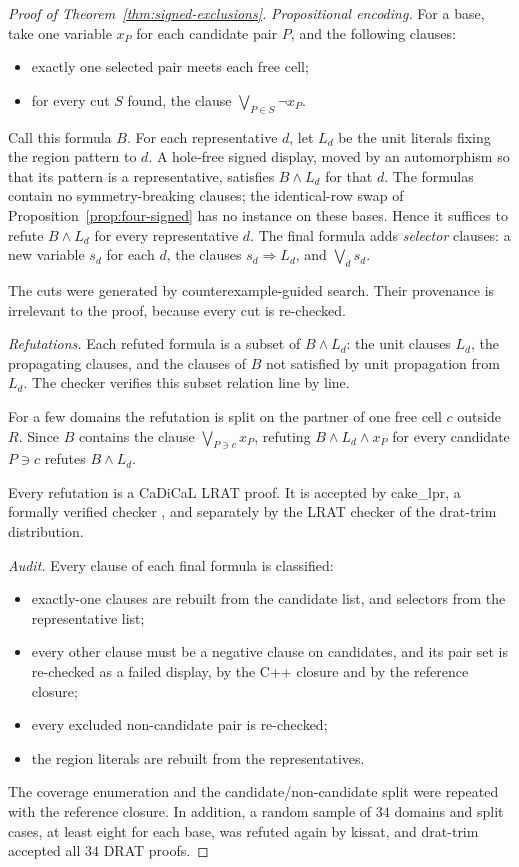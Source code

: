 \documentclass[11pt,a4paper]{article}
\theoremstyle{definition}
\begin{document}
\begin{proof}[Proof of Theorem~\ref{thm:signed-exclusions}]
\emph{Propositional encoding.} For a base, take one variable $x_P$ for
each candidate pair $P$, and the following clauses:
\begin{itemize}
\item exactly one selected pair meets each free cell;
\item for every cut $S$ found, the clause $\bigvee_{P\in S}\neg x_P$.
\end{itemize}
Call this formula $B$. For each representative $d$, let $L_d$ be the unit
literals fixing the region pattern to $d$. A hole-free signed display,
moved by an automorphism so that its pattern is a representative,
satisfies $B\wedge L_d$ for that $d$. The formulas contain no
symmetry-breaking clauses; the identical-row swap of
Proposition~\ref{prop:four-signed} has no instance on these bases.
Hence it suffices to refute $B\wedge L_d$ for every representative $d$.
The final formula adds \emph{selector} clauses: a new variable $s_d$
for each $d$, the clauses $s_d\Rightarrow L_d$, and $\bigvee_d s_d$.

The cuts were generated by counterexample-guided search. Their
provenance is irrelevant to the proof, because every cut is re-checked.

\emph{Refutations.} Each refuted formula is a subset of $B\wedge L_d$: the unit clauses
$L_d$, the propagating clauses, and the clauses of $B$ not satisfied
by unit propagation from $L_d$. The checker verifies this subset relation line by
line.

For a few domains the refutation is split on the partner of one free cell
$c$ outside $R$. Since $B$ contains the clause $\bigvee_{P\ni c}x_P$,
refuting $B\wedge L_d\wedge x_P$ for every candidate $P\ni c$ refutes
$B\wedge L_d$.

Every refutation is a CaDiCaL LRAT proof. It is accepted by cake\_lpr, a
formally verified checker \cite{CakeLPR}, and separately by the LRAT checker of the
drat-trim distribution.

\emph{Audit.} Every clause of each final formula is classified:
\begin{itemize}
\item exactly-one clauses are rebuilt from the candidate list, and
      selectors from the representative list;
\item every other clause must be a negative clause on candidates, and its
      pair set is re-checked as a failed display, by the C++ closure and by
      the reference closure;
\item every excluded non-candidate pair is re-checked;
\item the region literals are rebuilt from the representatives.
\end{itemize}
The coverage enumeration and the candidate/non-candidate split were
repeated with the reference closure.
In addition, a random sample of $34$ domains and split cases, at least
eight for each base, was refuted again by kissat, and drat-trim accepted
all $34$ DRAT proofs.


\end{proof}
\end{document}
